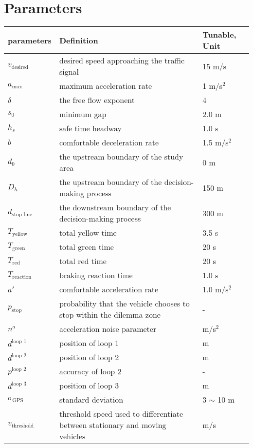 \section*{Parameters}
\begin{longtable}{p{2.5cm}p{10cm}p{2.5cm}}
    \toprule
    parameters  & Definition & Tunable, Unit \\
    \midrule\endhead %
    $v_{\text{desired}}$ & desired speed approaching the traffic signal & 15 m/s \\
    $a_{\text{max}}$ &  maximum acceleration rate  &  1 m/s$^2$ \\
    $\delta$ & the free flow exponent & 4 \\
    $s_0$ & minimum gap & 2.0 m \\
    $h_s$ & safe time headway  & 1.0 s \\
    $b$ & comfortable deceleration rate & 1.5 m/s$^2$ \\
    $d_0$ & the upstream boundary of the study area & 0 m\\
    $D_h$ & the upstream boundary of the decision-making process  & 150 m \\
    $d_\text{stop line}$ & the downstream boundary of the decision-making process & 300 m\\
    $T_{\text{yellow}}$ & total yellow time  & 3.5 s \\
    $T_{\text{green}}$ & total green time  & 20 s \\
    $T_{\text{red}}$ & total red time  & 20 s \\
    $T_{\text{reaction}}$  & braking reaction time  & 1.0 s \\
    $a'$ & comfortable acceleration rate & 1.0 m/s$^2$ \\
    $p_\text{stop}$ & probability that the vehicle chooses to stop within the dilemma zone & - \\
    $n^a$ & acceleration noise parameter & m/s$^2$ \\
    $d^\text{loop 1}$ & position of loop 1& m \\
    $d^\text{loop 2}$ & position of loop 2& m \\
    $p^\text{loop 2}$ & accuracy of loop 2 & - \\
    $d^\text{loop 3}$ & position of loop 3& m \\
    $\sigma_\text{GPS}$ &  standard deviation & 3 $\sim$ 10 m\\
    $v_\text{threshold}$ & threshold speed used to differentiate between stationary and moving vehicles & m/s\\
    \bottomrule
\end{longtable}